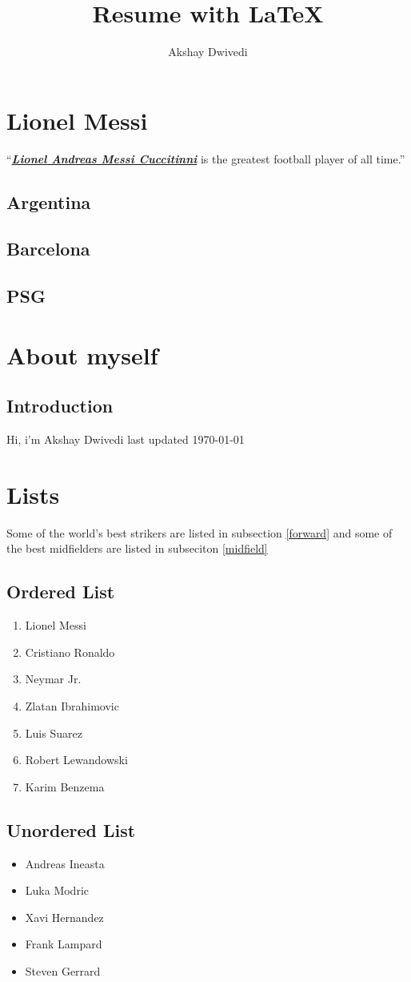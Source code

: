 \documentclass{article}
\author{Akshay Dwivedi}
\title{Resume with {\LaTeX}}
\begin{document}
\maketitle

\section{Lionel Messi}
``\underline{\textit{\textbf{Lionel Andreas Messi Cuccitinni}}} is the greatest football player of all time.''
\subsection{Argentina}
\subsection{Barcelona}
\subsection{PSG}

\section{About myself}
\subsection{Introduction}
Hi, i'm Akshay Dwivedi
last updated \today


\section{Lists}
Some of the world's best strikers are listed in subsection \ref{forward}
and some of the best midfielders are listed in subseciton \ref{midfield}
\subsection{Ordered List\label{forward}}
\begin{enumerate}
  \item Lionel Messi
  \item Cristiano Ronaldo
  \item Neymar Jr.
  \item Zlatan Ibrahimovic
  \item Luis Suarez
  \item Robert Lewandowski
  \item Karim Benzema
\end{enumerate}

\subsection{Unordered List\label{midfield}}
\begin{itemize}
  \item Andreas Ineasta  
  \item Luka Modric
  \item Xavi Hernandez
  \item Frank Lampard
  \item Steven Gerrard
\end{itemize}
\end{document}
